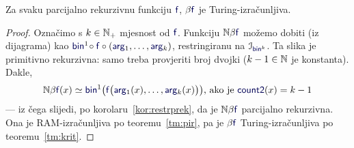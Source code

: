 

\begin{teorem}[{name=[Turing-izračunljivost parcijalno rekurzivnih brojevnih funkcija]}]\label{tm:pibt}
Za svaku parcijalno rekurzivnu funkciju $\f f$, $\beta\f f$ je Turing-izračunljiva.
\end{teorem}
\begin{proof}
Označimo s $k\in{\mathbb N}_+$ mjesnost od $\f f$. %
    Funkciju $\N\beta\f f$ možemo dobiti (iz dijagrama) kao $\f{bin}^1\!\circ\f f\circ(\f{arg}_1,\dotsc,\f{arg}_k)$, restringiranu na $\im{\f{bin}^k}$. Ta slika je primitivno rekurzivna: samo treba provjeriti broj dvojki ($k-1\in{\mathbb N}$ je konstanta).
Dakle,
\begin{equation}
\label{eq:defNbetaf}
    \N\beta\f f(x)\simeq\f{bin}^1\bigl(\f f\bigl(\f{arg}_1(x),\dotsc,\f{arg}_k(x)\bigr)\bigr)\text{, ako je }\f{count2}(x)=k-1
\end{equation}
--- iz čega slijedi, po korolaru~\ref{kor:restrprek}, da je $\N\beta\f f$ parcijalno rekurzivna. Ona je RAM-izračunljiva po teoremu~\ref{tm:pir},  pa je $\beta\f f$ Turing-iz\-rač\-un\-lji\-va po teoremu~\ref{tm:krit}.
\end{proof}

%
